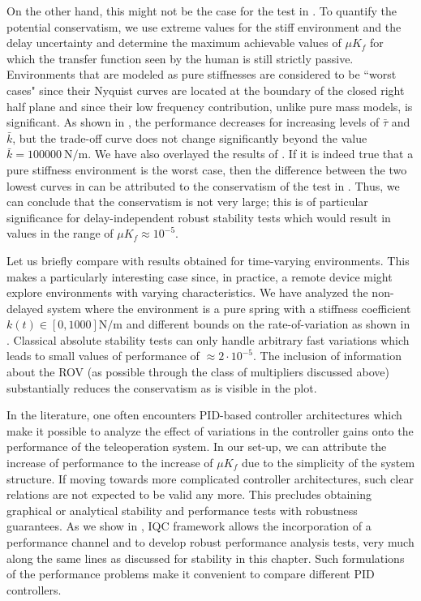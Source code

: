 On the other hand, this might not be the case for the test in . To
quantify the potential conservatism, we use extreme values for
the stiff environment and the delay uncertainty and determine
the maximum achievable values of $\mu K_f$ for which the transfer
function seen by the human is still strictly passive. Environments that
are modeled as pure stiffnesses are considered to be ``worst
cases" since their Nyquist curves are located at the boundary
of the closed right half plane and since their low frequency
contribution, unlike pure mass models, is significant. As shown in
, the performance decreases for increasing
levels of $\bar{\tau}$ and $\bar{k}$, but the trade-off curve does not change
significantly beyond the value $\bar{k} = \SI{100000}{\newton\per\metre}$. We have
also overlayed the results of . If it is indeed true
that a pure stiffness environment is the worst case, then the
difference between the two lowest curves in  can
be attributed to the conservatism of the test in .
Thus, we can conclude that the conservatism is not very large; this is of particular
significance for delay-independent robust stability tests which
would result in values in the range of $\mu K_f \approx 10^{-5}$.


Let us briefly compare with results obtained for time-varying
environments. This makes a particularly interesting
case since, in practice, a remote device might explore environments
with varying characteristics. We have analyzed
the non-delayed system where the environment is a pure
spring with a stiffness coefficient $k(t) \in [0,1000]\si{\newton\per\metre}$ and
different bounds on the rate-of-variation as shown in .
Classical absolute stability tests can only handle arbitrary
fast variations which leads to small values of performance
of $\approx 2\cdot 10^{-5}$. The inclusion of information about the ROV
(as possible through the class of multipliers discussed above)
substantially reduces the conservatism as is visible in the plot.



In the literature, one often encounters PID-based controller
architectures which make it possible to analyze the effect
of variations in the controller gains onto the performance of
the teleoperation system. In our set-up, we can attribute the increase of performance to the
increase of $\mu K_f$ due to the simplicity of the system structure.
If moving towards more complicated controller architectures,
such clear relations are not expected to be valid any more.
This precludes obtaining graphical or analytical stability and
performance tests with robustness guarantees. As we show in ,
 IQC framework allows the incorporation of a performance channel and to develop
robust performance analysis tests, very much along the same
lines as discussed for stability in this chapter. Such formulations
of the performance problems make it convenient to compare 
different PID controllers. 

